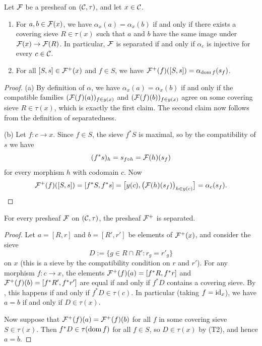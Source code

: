 \begin{proposition}\label{prop:chap:sheaves:sec:sites:plus construction local representatives}
    Let $\cal{F}$ be a presheaf on $(\catC,\tau)$, and let $x \in \catC$.
    \begin{enumerate}[label=(\alph*)]
        \item For $a, b \in \cal{F}(x)$, we have $\alpha_x(a) = \alpha_x(b)$ if and only if there exists a covering sieve $R \in \tau(x)$ such that $a$ and $b$ have the same image under $\cal{F}(x) \to \cal{F}(R)$. In particular, $\cal{F}$ is separated if and only if $\alpha_c$ is injective for every $c \in \catC$.
        \item For all $[S,s] \in \cal{F}^+(x)$ and $f \in S$, we have $\cal{F}^+(f)([S,s]) = \alpha_{\dom f}(s_f)$.
    \end{enumerate}
\end{proposition}
\begin{proof}
    (a) By definition of $\alpha$, we have $\alpha_x(a) = \alpha_x(b)$ if and only if the compatible families $(\cal{F}(f)(a))_{f \in y(x)}$ and $(\cal{F}(f)(b))_{f \in y(x)}$ agree on some covering sieve $R \in \tau(x)$, which is exactly the first claim. The second claim now follows from the definition of separatedness.

    (b) Let $f : c \to x$. Since $f \in S$, the sieve $f^* S$ is maximal, so by the compatibility of $s$ we have
    \[(f^* s)_h = s_{f \circ h} = \cal{F}(h)(s_f)\]
    for every morphism $h$ with codomain $c$. Now
    \[\cal{F}^+(f)([S,s]) = [f^* S, f^* s] = \big[y(c), \big(\cal{F}(h)(s_f)\big)_{h \in y(c)}\big] = \alpha_c(s_f). \qedhere\]
\end{proof}


\begin{proposition}\label{prop:chap:sheaves:sec:sites:plus construction is separated}
    For every presheaf $\cal{F}$ on $(\catC,\tau)$, the presheaf $\cal{F}^+$ is separated.
\end{proposition}
\begin{proof}
    Let $a = [R,r]$ and $b = [R',r']$ be elements of $\cal{F}^+(x)$, and consider the sieve
    \[D := \{g \in R \cap R' : r_g = r'_g\}\]
    on $x$ (this is a sieve by the compatibility condition on $r$ and $r'$). For any morphism $f : c \to x$, the elements $\cal{F}^+(f)(a) = [f^* R, f^* r]$ and $\cal{F}^+(f)(b) = [f^* R', f^* r']$ are equal if and only if $f^* D$ contains a covering sieve. By , this happens if and only if $f^* D \in \tau(c)$. In particular (taking $f = \id_x$), we have $a = b$ if and only if $D \in \tau(x)$.

    Now suppose that $\cal{F}^+(f)(a) = \cal{F}^+(f)(b)$ for all $f$ in some covering sieve $S \in \tau(x)$. Then $f^* D \in \tau(\dom f)$ for all $f \in S$, so $D \in \tau(x)$ by (T2), and hence $a = b$.
\end{proof}

